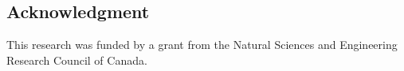 \documentclass[../main.tex]{subfiles}
\begin{document}
\begin{refsection}


\section*{Acknowledgment}

This research was funded by a grant from the Natural Sciences and Engineering Research Council of Canada.



\printbibliography[heading=subbibintoc]
\end{refsection}
\end{document}
